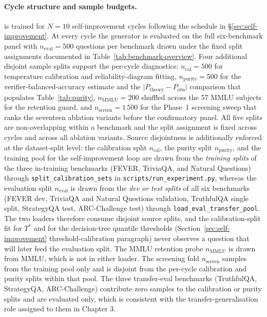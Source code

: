 \paragraph{Cycle structure and sample budgets.}
\caem{} is trained for $N = 10$ self-improvement cycles following the
schedule in \S\ref{sec:self-improvement}. At every cycle the
generator is evaluated on the full six-benchmark panel with
$n_{\text{eval}} = 500$ questions per benchmark drawn under the
fixed split assignments documented in Table~\ref{tab:benchmark-overview}.
Four additional disjoint sample splits support the per-cycle
diagnostics: $n_{\text{cal}} = 500$ for temperature calibration and
reliability-diagram fitting, $n_{\text{purity}} = 500$ for the
verifier-balanced-accuracy estimate and the
$\lvert P_{\text{theory}} - P_{\text{obs}} \rvert$ comparison that
populates Table~\ref{tab:purity}, $n_{\text{MMLU}} = 200$ shuffled
across the 57 MMLU subjects for the retention guard, and
$n_{\text{screen}} = 1\,500$ for the Phase~1 screening sweep that
ranks the seventeen ablation variants before the
confirmatory panel. All five splits are non-overlapping within a
benchmark and the split assignment is fixed across cycles and across
all ablation variants. Source disjointness is additionally enforced
at the dataset-split level: the calibration split $n_{\text{cal}}$,
the purity split $n_{\text{purity}}$, and the training pool for the
self-improvement loop are drawn from the \emph{training splits} of
the three in-training benchmarks (FEVER, TriviaQA, and Natural
Questions) through \texttt{split\_calibration\_sets} in
\texttt{scripts/run\_experiment.py}, whereas the evaluation split
$n_{\text{eval}}$ is drawn from the \emph{dev or test splits} of all
six benchmarks (FEVER dev, TriviaQA and Natural Questions validation,
TruthfulQA single split, StrategyQA test, ARC-Challenge test) through
\texttt{load\_eval\_transfer\_pool}. The two loaders therefore
consume disjoint source splits, and the calibration-split fit for
$T^{*}$ and for the decision-tree quantile thresholds
(Section~\ref{sec:self-improvement} threshold-calibration paragraph)
never observes a question that will later feed the evaluation split.
The MMLU retention probe $n_{\text{MMLU}}$ is drawn from MMLU, which
is not in either loader. The screening fold $n_{\text{screen}}$
samples from the training pool only and is disjoint from the
per-cycle calibration and purity splits within that pool. The three
transfer-eval benchmarks (TruthfulQA, StrategyQA, ARC-Challenge)
contribute zero samples to the calibration or purity splits and are
evaluated only, which is consistent with the
transfer-generalisation role assigned to them in Chapter 3.

